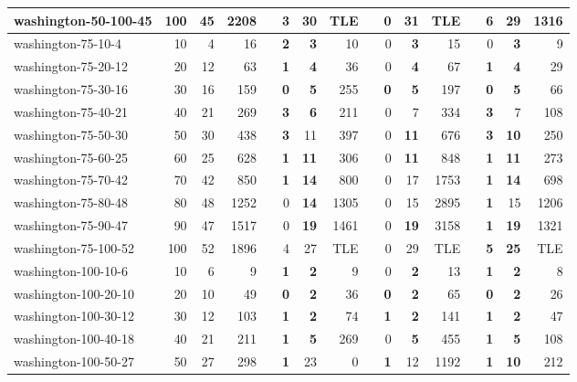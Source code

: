 \begin{table}[!ht]
{\begin{tabular}{lrrrrrrrrrrrlrrr}
washington-50-100-45 & 100 & 45 & 2208 &  & 3 & 30 & TLE &  & 0 & 31 & TLE &  & \textbf{6} & \textbf{29} & 1316 \\ \hline
washington-75-10-4 & 10 & 4 & 16 &  & \textbf{2} & \textbf{3} & 10 &  & 0 & \textbf{3} & 15 &  & 0 & \textbf{3} & 9 \\
washington-75-20-12 & 20 & 12 & 63 &  & \textbf{1} & \textbf{4} & 36 &  & 0 & \textbf{4} & 67 &  & \textbf{1} & \textbf{4} & 29 \\
washington-75-30-16 & 30 & 16 & 159 &  & \textbf{0} & \textbf{5} & 255 &  & \textbf{0} & \textbf{5} & 197 &  & \textbf{0} & \textbf{5} & 66 \\
washington-75-40-21 & 40 & 21 & 269 &  & \textbf{3} & \textbf{6} & 211 &  & 0 & 7 & 334 &  & \textbf{3} & 7 & 108 \\
washington-75-50-30 & 50 & 30 & 438 &  & \textbf{3} & 11 & 397 &  & 0 & \textbf{11} & 676 &  & \textbf{3} & \textbf{10} & 250 \\
washington-75-60-25 & 60 & 25 & 628 &  & \textbf{1} & \textbf{11} & 306 &  & 0 & \textbf{11} & 848 &  & \textbf{1} & \textbf{11} & 273 \\
washington-75-70-42 & 70 & 42 & 850 &  & \textbf{1} & \textbf{14} & 800 &  & 0 & 17 & 1753 &  & \textbf{1} & \textbf{14} & 698 \\
washington-75-80-48 & 80 & 48 & 1252 &  & 0 & \textbf{14} & 1305 &  & 0 & 15 & 2895 &  & \textbf{1} & 15 & 1206 \\
washington-75-90-47 & 90 & 47 & 1517 &  & 0 & \textbf{19} & 1461 &  & 0 & \textbf{19} & 3158 &  & \textbf{1} & \textbf{19} & 1321 \\
washington-75-100-52 & 100 & 52 & 1896 &  & 4 & 27 & TLE &  & 0 & 29 & TLE &  & \textbf{5} & \textbf{25} & TLE \\ \hline
washington-100-10-6 & 10 & 6 & 9 &  & \textbf{1} & \textbf{2} & 9 &  & 0 & \textbf{2} & 13 &  & \textbf{1} & \textbf{2} & 8 \\
washington-100-20-10 & 20 & 10 & 49 &  & \textbf{0} & \textbf{2} & 36 &  & \textbf{0} & \textbf{2} & 65 &  & \textbf{0} & \textbf{2} & 26 \\
washington-100-30-12 & 30 & 12 & 103 &  & \textbf{1} & \textbf{2} & 74 &  & \textbf{1} & \textbf{2} & 141 &  & \textbf{1} & \textbf{2} & 47 \\
washington-100-40-18 & 40 & 21 & 211 &  & \textbf{1} & \textbf{5} & 269 &  & 0 & \textbf{5} & 455 &  & \textbf{1} & \textbf{5} & 108 \\
washington-100-50-27 & 50 & 27 & 298 &  & \textbf{1} & 23 & 0 &  & \textbf{1} & 12 & 1192 &  & \textbf{1} & \textbf{10} & 212 \\

\end{tabular}}
\end{table}
